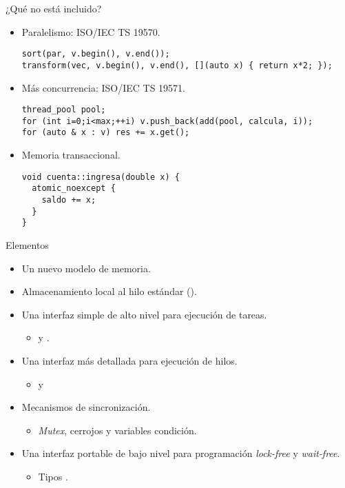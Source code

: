 \begin{frame}[t,fragile]{¿Qué no está incluido?}
\begin{itemize}
  \item Paralelismo: ISO/IEC TS 19570.
\begin{lstlisting}
sort(par, v.begin(), v.end());
transform(vec, v.begin(), v.end(), [](auto x) { return x*2; });
\end{lstlisting}
  \item Más concurrencia: ISO/IEC TS 19571.
\begin{lstlisting}
thread_pool pool;
for (int i=0;i<max;++i) v.push_back(add(pool, calcula, i));
for (auto & x : v) res += x.get();
\end{lstlisting}
  \item Memoria transaccional.
\begin{lstlisting}
void cuenta::ingresa(double x) {
  atomic_noexcept {
    saldo += x;
  }
}
\end{lstlisting}
\end{itemize}
\end{frame}

\begin{frame}[t]{Elementos}
\begin{itemize}
  \item Un nuevo modelo de memoria.
  \pause
  \item Almacenamiento local al hilo estándar ().
  \pause
  \item Una interfaz simple de alto nivel para ejecución de tareas.
    \begin{itemize}
      \item {} y .
    \end{itemize}
  \pause
  \item Una interfaz más detallada para ejecución de hilos.
    \begin{itemize}
      \item {} y 
    \end{itemize}
  \pause
  \item Mecanismos de sincronización.
    \begin{itemize}
      \item \emph{Mutex}, cerrojos y variables condición.
    \end{itemize}
  \pause
  \item Una interfaz portable de bajo nivel para programación \emph{lock-free} y
\emph{wait-free}.
    \begin{itemize}
      \item Tipos .
    \end{itemize}
\end{itemize}
\end{frame}
